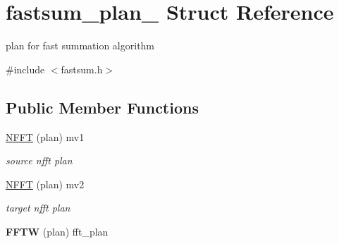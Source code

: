 \hypertarget{structfastsum__plan__}{\section{fastsum\-\_\-plan\-\_\- Struct Reference}
\label{structfastsum__plan__}
}


plan for fast summation algorithm  




{\ttfamily \#include $<$fastsum.\-h$>$}

\subsection*{Public Member Functions}
\begin{DoxyCompactItemize}
\item 
\hypertarget{structfastsum__plan___a34f2a9dc8600cb9abf5ab0ee6b13a873}{\hyperlink{structfastsum__plan___a34f2a9dc8600cb9abf5ab0ee6b13a873}{N\-F\-F\-T} (plan) mv1}\label{structfastsum__plan___a34f2a9dc8600cb9abf5ab0ee6b13a873}

\begin{DoxyCompactList}\small\item\em source nfft plan \end{DoxyCompactList}\item 
\hypertarget{structfastsum__plan___ac3b774f681f804f5003beb558cedbfe4}{\hyperlink{structfastsum__plan___ac3b774f681f804f5003beb558cedbfe4}{N\-F\-F\-T} (plan) mv2}\label{structfastsum__plan___ac3b774f681f804f5003beb558cedbfe4}

\begin{DoxyCompactList}\small\item\em target nfft plan \end{DoxyCompactList}\item 
\hypertarget{structfastsum__plan___a5d15d527612f5ed99fc8cbaa26992543}{{\bfseries F\-F\-T\-W} (plan) fft\-\_\-plan}\label{structfastsum__plan___a5d15d527612f5ed99fc8cbaa26992543}

\end{DoxyCompactItemize}
